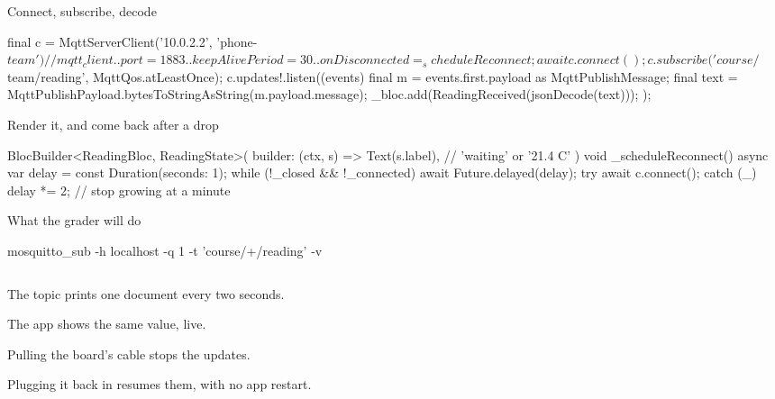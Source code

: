 \documentclass[10pt,aspectratio=169,t]{beamer}
\begin{document}
\begin{frame}[fragile,eyebrow=Task III]{Connect, subscribe, decode}
\begin{dart}
final c = MqttServerClient('10.0.2.2', 'phone-$team')  // mqtt_client
  ..port = 1883
  ..keepAlivePeriod = 30
  ..onDisconnected = _scheduleReconnect;
await c.connect();
c.subscribe('course/$team/reading', MqttQos.atLeastOnce);
c.updates!.listen((events) {
  final m = events.first.payload as MqttPublishMessage;
  final text = MqttPublishPayload.bytesToStringAsString(m.payload.message);
  _bloc.add(ReadingReceived(jsonDecode(text)));
});
\end{dart}
  \vskip 2mm
\end{frame}

\begin{frame}[fragile,eyebrow=Task III]{Render it, and come back after a drop}
\begin{dart}
BlocBuilder<ReadingBloc, ReadingState>(
  builder: (ctx, s) => Text(s.label),   // 'waiting' or '21.4 C'
)
void _scheduleReconnect() async {
  var delay = const Duration(seconds: 1);
  while (!_closed && !_connected) {
    await Future.delayed(delay);
    try { await c.connect(); } catch (_) {}
    delay *= 2;              // stop growing at a minute
  }
}
\end{dart}
  \vskip 1mm
\end{frame}

\begin{frame}[fragile,eyebrow=Acceptance]{What the grader will do}
  \vskip 1mm
\begin{shell}
mosquitto_sub -h localhost -q 1 -t 'course/+/reading' -v
\end{shell}
  \vskip 3mm
  \begin{columns}[T]
    \begin{column}{0.48\textwidth}
      \begin{checklist}
        \item The topic prints one document every two seconds.
        \item The app shows the same value, live.
        \item Pulling the board's cable stops the updates.
        \item Plugging it back in resumes them, with no app restart.
      \end{checklist}
    \end{column}
    \begin{column}{0.48\textwidth}
    \end{column}
  \end{columns}
\end{frame}
\end{document}
